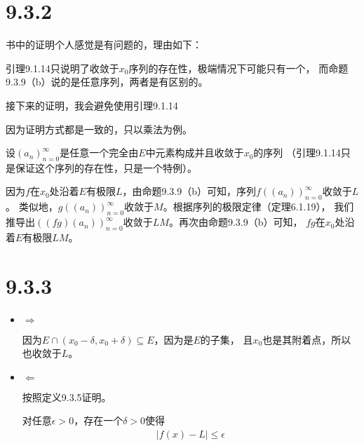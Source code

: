 \documentclass{article}
\begin{document}
\section*{9.3.2}

\begin{zremark}
  书中的证明个人感觉是有问题的，理由如下：

  引理9.1.14只说明了收敛于$x_0$序列的存在性，极端情况下可能只有一个，
  而命题9.3.9（b）说的是任意序列，两者是有区别的。

  接下来的证明，我会避免使用引理9.1.14
\end{zremark}

因为证明方式都是一致的，只以乘法为例。

设$(a_n)_{n=0}^\infty$是任意一个完全由$E$中元素构成并且收敛于$x_0$的序列
（引理9.1.14只是保证这个序列的存在性，只是一个特例）。

因为$f$在$x_0$处沿着$E$有极限$L$，由命题9.3.9（b）可知，序列$f((a_n))_{n=0}^\infty$收敛于$L$。
类似地，$g((a_n))_{n=0}^\infty$收敛于$M$。根据序列的极限定律（定理6.1.19），
我们推导出$((fg)(a_n))_{n=0}^\infty$收敛于$LM$。再次由命题9.3.9（b）可知，
$fg$在$x_0$处沿着$E$有极限$LM$。

\section*{9.3.3}

\begin{itemize}
  \item $\Rightarrow$

        因为$ E \cap (x_0 - \delta, x_0 + \delta) \subseteq E$，因为是$E$的子集，
        且$x_0$也是其附着点，所以也收敛于$L$。
  \item $\Leftarrow$

        按照定义9.3.5证明。

        对任意$\epsilon > 0$，存在一个$\delta > 0$使得
        \begin{align*}
          |f(x) - L| \leq \epsilon
        \end{align*}
\end{itemize}
\end{document}

